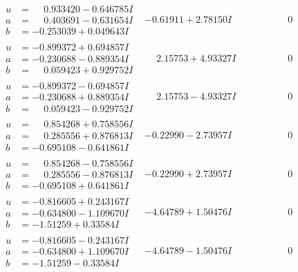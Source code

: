 \documentclass[1p]{elsarticle_modified}
\theoremstyle{definition}
\begin{document}
$$\begin{array}{c|c|c}
\begin{aligned}
u &= \phantom{-}0.933420 - 0.646785 I \\
a &= \phantom{-}0.403691 - 0.631654 I \\
b &= -0.253039 + 0.049643 I\end{aligned}
 & -0.61911 + 2.78150 I & \phantom{-0.000000 } 0 \\ \hline\begin{aligned}
u &= -0.899372 + 0.694857 I \\
a &= -0.230688 - 0.889354 I \\
b &= \phantom{-}0.059423 + 0.929752 I\end{aligned}
 & \phantom{-}2.15753 + 4.93327 I & \phantom{-0.000000 } 0 \\ \hline\begin{aligned}
u &= -0.899372 - 0.694857 I \\
a &= -0.230688 + 0.889354 I \\
b &= \phantom{-}0.059423 - 0.929752 I\end{aligned}
 & \phantom{-}2.15753 - 4.93327 I & \phantom{-0.000000 } 0 \\ \hline\begin{aligned}
u &= \phantom{-}0.854268 + 0.758556 I \\
a &= \phantom{-}0.285556 + 0.876813 I \\
b &= -0.695108 - 0.641861 I\end{aligned}
 & -0.22990 - 2.73957 I & \phantom{-0.000000 } 0 \\ \hline\begin{aligned}
u &= \phantom{-}0.854268 - 0.758556 I \\
a &= \phantom{-}0.285556 - 0.876813 I \\
b &= -0.695108 + 0.641861 I\end{aligned}
 & -0.22990 + 2.73957 I & \phantom{-0.000000 } 0 \\ \hline\begin{aligned}
u &= -0.816605 + 0.243167 I \\
a &= -0.634800 - 1.109670 I \\
b &= -1.51259 + 0.33584 I\end{aligned}
 & -4.64789 + 1.50476 I & \phantom{-0.000000 } 0 \\ \hline\begin{aligned}
u &= -0.816605 - 0.243167 I \\
a &= -0.634800 + 1.109670 I \\
b &= -1.51259 - 0.33584 I\end{aligned}
 & -4.64789 - 1.50476 I & \phantom{-0.000000 } 0\\

\end{array}$$
\end{document}
